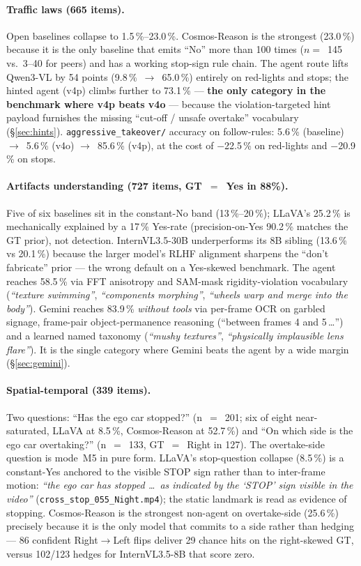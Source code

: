\documentclass[11pt,a4paper]{article}
\newcommand{\pct}[1]{#1\,\%}
\newcommand{\code}[1]{\texttt{#1}}
\begin{document}
\paragraph{Traffic laws (665 items).} Open baselines collapse to
\pct{1.5}--\pct{23.0}. Cosmos-Reason is the strongest (\pct{23.0})
because it is the only baseline that emits ``No'' more than 100 times
($n=$~145 vs.~3--40 for peers) and has a working stop-sign rule chain.
The agent route lifts Qwen3-VL by 54 points
(\pct{9.8}~$\to$~\pct{65.0}) entirely on red-lights and stops; the
hinted agent (v4p) climbs further to \pct{73.1} ---
\textbf{the only category in the benchmark where v4p beats v4o} ---
because the violation-targeted hint payload furnishes the missing
``cut-off / unsafe overtake'' vocabulary (\S\ref{sec:hints}).
\code{aggressive\_takeover/} accuracy on follow-rules: \pct{5.6}
(baseline) $\to$~\pct{5.6} (v4o) $\to$~\pct{85.6} (v4p), at the cost
of $-$\pct{22.5} on red-lights and $-$\pct{20.9} on stops.

\paragraph{Artifacts understanding (727 items, GT~$=$~Yes in 88\%).}
Five of six baselines sit in the constant-No band (\pct{13}--\pct{20});
LLaVA's \pct{25.2} is mechanically explained by a \pct{17} Yes-rate
(precision-on-Yes \pct{90.2} matches the GT prior), not detection.
InternVL3.5-30B underperforms its 8B sibling (\pct{13.6} vs
\pct{20.1}) because the larger model's RLHF alignment sharpens the
``don't fabricate'' prior --- the wrong default on a Yes-skewed
benchmark. The agent reaches \pct{58.5} via FFT anisotropy and SAM-mask
rigidity-violation vocabulary (\emph{``texture swimming''},
\emph{``components morphing''}, \emph{``wheels warp and merge into the
body''}). Gemini reaches \pct{83.9} \emph{without tools} via per-frame
OCR on garbled signage, frame-pair object-permanence reasoning
(``between frames 4 and 5\,\dots'') and a learned named taxonomy
(\emph{``mushy textures''}, \emph{``physically implausible lens
flare''}). It is the single category where Gemini beats the agent by
a wide margin (\S\ref{sec:gemini}).

\paragraph{Spatial-temporal (339 items).} Two questions: ``Has the ego
car stopped?'' (n~$=$~201; six of eight near-saturated, LLaVA at
\pct{8.5}, Cosmos-Reason at \pct{52.7}) and ``On which side is the ego
car overtaking?'' (n~$=$~133, GT~$=$~Right in 127). The overtake-side
question is mode~M5 in pure form. LLaVA's stop-question collapse
(\pct{8.5}) is a constant-Yes anchored to the visible STOP sign rather
than to inter-frame motion: \emph{``the ego car has stopped \dots\ as
indicated by the `STOP' sign visible in the video''}
(\code{cross\_stop\_055\_Night.mp4}); the static landmark is read as
evidence of stopping. Cosmos-Reason is the strongest non-agent on
overtake-side (\pct{25.6}) precisely because it is the only model that
commits to a side rather than hedging --- 86 confident
Right$\to$Left flips deliver 29 chance hits on the right-skewed GT,
versus 102/123 hedges for InternVL3.5-8B that score zero.
\end{document}
